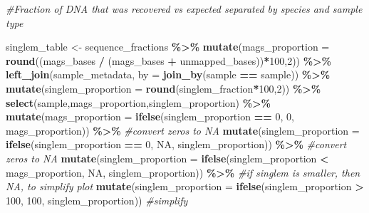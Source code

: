 \documentclass[
]{book}
\newenvironment{Shaded}{\begin{snugshade}}{\end{snugshade}}
\newcommand{\AttributeTok}[1]{\textcolor[rgb]{0.13,0.29,0.53}{#1}}
\newcommand{\CommentTok}[1]{\textcolor[rgb]{0.56,0.35,0.01}{\textit{#1}}}
\newcommand{\ConstantTok}[1]{\textcolor[rgb]{0.56,0.35,0.01}{#1}}
\newcommand{\DecValTok}[1]{\textcolor[rgb]{0.00,0.00,0.81}{#1}}
\newcommand{\FunctionTok}[1]{\textcolor[rgb]{0.13,0.29,0.53}{\textbf{#1}}}
\newcommand{\NormalTok}[1]{#1}
\newcommand{\OtherTok}[1]{\textcolor[rgb]{0.56,0.35,0.01}{#1}}
\newcommand{\SpecialCharTok}[1]{\textcolor[rgb]{0.81,0.36,0.00}{\textbf{#1}}}
\begin{document}
\begin{Shaded}
\begin{Highlighting}[]
\CommentTok{\#Fraction of DNA that was recovered vs expected separated by species and sample type}

\NormalTok{singlem\_table }\OtherTok{\textless{}{-}}\NormalTok{ sequence\_fractions }\SpecialCharTok{\%\textgreater{}\%}
    \FunctionTok{mutate}\NormalTok{(}\AttributeTok{mags\_proportion =} \FunctionTok{round}\NormalTok{((mags\_bases }\SpecialCharTok{/}\NormalTok{ (mags\_bases }\SpecialCharTok{+}\NormalTok{ unmapped\_bases))}\SpecialCharTok{*}\DecValTok{100}\NormalTok{,}\DecValTok{2}\NormalTok{)) }\SpecialCharTok{\%\textgreater{}\%}
    \FunctionTok{left\_join}\NormalTok{(sample\_metadata, }\AttributeTok{by =} \FunctionTok{join\_by}\NormalTok{(sample }\SpecialCharTok{==}\NormalTok{ sample))  }\SpecialCharTok{\%\textgreater{}\%}
    \FunctionTok{mutate}\NormalTok{(}\AttributeTok{singlem\_proportion =} \FunctionTok{round}\NormalTok{(singlem\_fraction}\SpecialCharTok{*}\DecValTok{100}\NormalTok{,}\DecValTok{2}\NormalTok{)) }\SpecialCharTok{\%\textgreater{}\%}
    \FunctionTok{select}\NormalTok{(sample,mags\_proportion,singlem\_proportion) }\SpecialCharTok{\%\textgreater{}\%}
    \FunctionTok{mutate}\NormalTok{(}\AttributeTok{mags\_proportion =} \FunctionTok{ifelse}\NormalTok{(singlem\_proportion }\SpecialCharTok{==} \DecValTok{0}\NormalTok{, }\DecValTok{0}\NormalTok{, mags\_proportion)) }\SpecialCharTok{\%\textgreater{}\%} \CommentTok{\#convert zeros to NA}
    \FunctionTok{mutate}\NormalTok{(}\AttributeTok{singlem\_proportion =} \FunctionTok{ifelse}\NormalTok{(singlem\_proportion }\SpecialCharTok{==} \DecValTok{0}\NormalTok{, }\ConstantTok{NA}\NormalTok{, singlem\_proportion)) }\SpecialCharTok{\%\textgreater{}\%} \CommentTok{\#convert zeros to NA}
    \FunctionTok{mutate}\NormalTok{(}\AttributeTok{singlem\_proportion =} \FunctionTok{ifelse}\NormalTok{(singlem\_proportion }\SpecialCharTok{\textless{}}\NormalTok{ mags\_proportion, }\ConstantTok{NA}\NormalTok{, singlem\_proportion)) }\SpecialCharTok{\%\textgreater{}\%} \CommentTok{\#if singlem is smaller, then NA, to simplify plot}
    \FunctionTok{mutate}\NormalTok{(}\AttributeTok{singlem\_proportion =} \FunctionTok{ifelse}\NormalTok{(singlem\_proportion }\SpecialCharTok{\textgreater{}} \DecValTok{100}\NormalTok{, }\DecValTok{100}\NormalTok{, singlem\_proportion)) }\CommentTok{\#simplify}


\end{Highlighting}
\end{Shaded}
\end{document}
